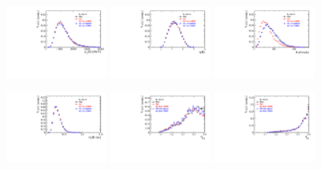 \begin{figure}[h]
\centering
\includegraphics[height=!,width=0.3\textwidth]{figs/dataVsMC/norm_final/combined/Ds2KKpi_1_Bs_PT.pdf}
\includegraphics[height=!,width=0.3\textwidth]{figs/dataVsMC/norm_final/combined/Ds2KKpi_1_Bs_ETA.pdf}
\includegraphics[height=!,width=0.3\textwidth]{figs/dataVsMC/norm_final/combined/Ds2KKpi_1_NTracks.pdf}

\includegraphics[height=!,width=0.3\textwidth]{figs/dataVsMC/norm_final/combined/Ds2KKpi_1_Bs_DTF_TAUERR.pdf}
\includegraphics[height=!,width=0.3\textwidth]{figs/dataVsMC/norm_final/combined/Ds2KKpi_1_Bs_TAGOMEGA_OS.pdf}
\includegraphics[height=!,width=0.3\textwidth]{figs/dataVsMC/norm_final/combined/Ds2KKpi_1_Bs_SS_nnetKaon_PROB.pdf}


\end{figure}
